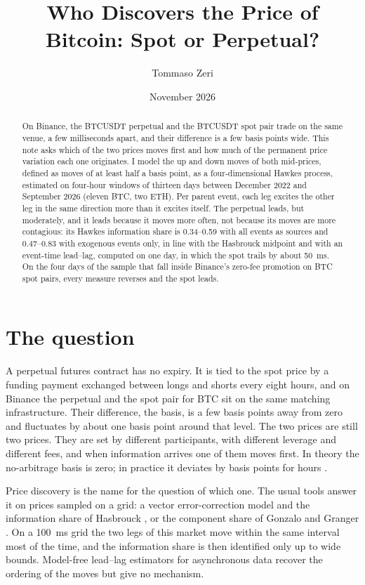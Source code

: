 \documentclass[a4paper,11pt]{article}
\title{Who Discovers the Price of Bitcoin: Spot or Perpetual?}
\author{Tommaso Zeri}
\date{November 2026}
\begin{document}
\maketitle

\begin{abstract}
\noindent
On Binance, the BTCUSDT perpetual and the BTCUSDT spot pair trade on the same venue, a few milliseconds apart, and their difference is a few basis points wide. This note asks which of the two prices moves first and how much of the permanent price variation each one originates. I model the up and down moves of both mid-prices, defined as moves of at least half a basis point, as a four-dimensional Hawkes process, estimated on four-hour windows of thirteen days between December 2022 and September 2026 (eleven BTC, two ETH). Per parent event, each leg excites the other leg in the same direction more than it excites itself. The perpetual leads, but moderately, and it leads because it moves more often, not because its moves are more contagious: its Hawkes information share is 0.34--0.59 with all events as sources and 0.47--0.83 with exogenous events only, in line with the Hasbrouck midpoint and with an event-time lead--lag, computed on one day, in which the spot trails by about 50~ms. On the four days of the sample that fall inside Binance's zero-fee promotion on BTC spot pairs, every measure reverses and the spot leads.
\end{abstract}

\section{The question}

A perpetual futures contract has no expiry. It is tied to the spot price by a funding payment exchanged between longs and shorts every eight hours, and on Binance the perpetual and the spot pair for BTC sit on the same matching infrastructure. Their difference, the basis, is a few basis points away from zero and fluctuates by about one basis point around that level. The two prices are still two prices. They are set by different participants, with different leverage and different fees, and when information arrives one of them moves first. In theory the no-arbitrage basis is zero; in practice it deviates by basis points for hours \cite{he2022}.

Price discovery is the name for the question of which one. The usual tools answer it on prices sampled on a grid: a vector error-correction model and the information share of Hasbrouck \cite{hasbrouck2021}, or the component share of Gonzalo and Granger \cite{yan2010}. On a 100~ms grid the two legs of this market move within the same interval most of the time, and the information share is then identified only up to wide bounds. Model-free lead--lag estimators for asynchronous data \cite{hayashi2005} recover the ordering of the moves but give no mechanism.
\end{document}
